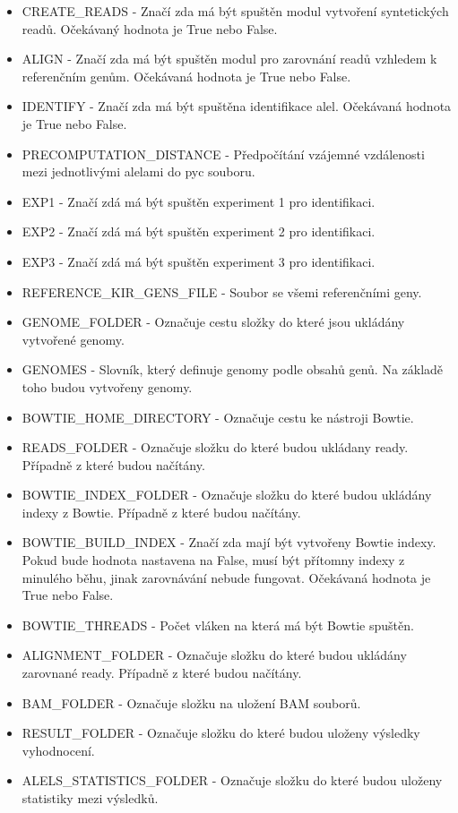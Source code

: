 \documentclass[czech,DP]{thesiskiv}
\numberwithin{equation}{section}
\begin{document}
\begin{itemize}
	\item CREATE\_READS - Značí zda má být spuštěn modul vytvoření syntetických readů. Očekávaný hodnota je True nebo False.
	\item ALIGN - Značí zda má být spuštěn modul pro zarovnání readů vzhledem k referenčním genům. Očekávaná hodnota je True nebo False.
	\item IDENTIFY - Značí zda má být spuštěna identifikace alel. Očekávaná hodnota je True nebo False.
	\item PRECOMPUTATION\_DISTANCE - Předpočítání vzájemné vzdálenosti mezi jednotlivými alelami do pyc souboru. 
	\item EXP1 - Značí zdá má být spuštěn experiment 1 pro identifikaci.
	\item EXP2 - Značí zdá má být spuštěn experiment 2 pro identifikaci.
	\item EXP3 - Značí zdá má být spuštěn experiment 3 pro identifikaci.
	\item REFERENCE\_KIR\_GENS\_FILE - Soubor se všemi referenčními geny. 
	\item GENOME\_FOLDER - Označuje cestu složky do které jsou ukládány vytvořené genomy. 
	\item GENOMES - Slovník, který definuje genomy podle obsahů genů. Na základě toho budou vytvořeny genomy.
	\item BOWTIE\_HOME\_DIRECTORY - Označuje cestu ke nástroji Bowtie.
	\item READS\_FOLDER - Označuje složku do které budou ukládany ready. Případně z které budou načítány.
	\item BOWTIE\_INDEX\_FOLDER - Označuje složku do které budou ukládány indexy z Bowtie. Případně z které budou načítány. 
	\item BOWTIE\_BUILD\_INDEX - Značí zda mají být vytvořeny Bowtie indexy. Pokud bude hodnota nastavena na False, musí být přítomny indexy z minulého běhu, jinak zarovnávání nebude fungovat. Očekávaná hodnota je True nebo False.
	\item BOWTIE\_THREADS - Počet vláken na která má být Bowtie spuštěn.	
	\item ALIGNMENT\_FOLDER - Označuje složku do které budou ukládány zarovnané ready. Případně z které budou načítány. 
	\item BAM\_FOLDER - Označuje složku na uložení BAM souborů.  
	\item RESULT\_FOLDER - Označuje složku do které budou uloženy výsledky vyhodnocení.
	\item ALELS\_STATISTICS\_FOLDER - Označuje složku do které budou uloženy statistiky mezi výsledků.

\end{itemize}
\end{document}
